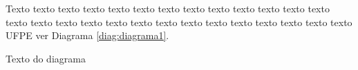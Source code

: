 Texto texto texto texto texto texto texto texto texto texto texto texto texto texto texto texto texto texto texto texto texto texto texto texto texto texto texto \gls{UFPE} ver Diagrama \ref{diag:diagrama1}.

\begin{diagrama}[ht!]
\centering

\caption{\textmd{Texto do diagrama}}
\label{diag:diagrama1}

\end{diagrama}
    
